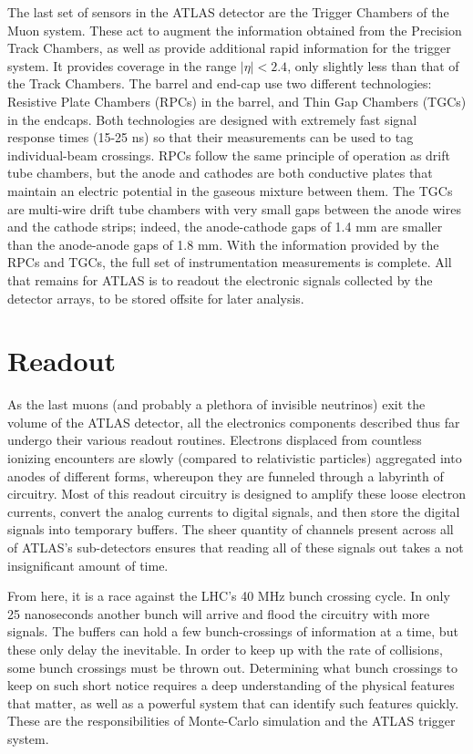         The last set of sensors in the ATLAS detector are the Trigger Chambers of the Muon system.
        These act to augment the information obtained from the Precision Track Chambers,
            as well as provide additional rapid information for the trigger system.
        It provides coverage in the range $|\eta| < 2.4$, only slightly less than that of the Track Chambers.
        The barrel and end-cap use two different technologies:
            Resistive Plate Chambers (RPCs) in the barrel, and Thin Gap Chambers (TGCs) in the endcaps.
        Both technologies are designed with extremely fast signal response times (15-25 ns) so that their measurements can be used to tag individual-beam crossings.
        RPCs follow the same principle of operation as drift tube chambers, but the anode and cathodes are both conductive plates that maintain an electric potential in the gaseous mixture between them.
        The TGCs are multi-wire drift tube chambers with very small gaps between the anode wires and the cathode strips;
            indeed, the anode-cathode gaps of 1.4 mm are smaller than the anode-anode gaps of 1.8 mm.
        With the information provided by the RPCs and TGCs, the full set of instrumentation measurements is complete.
        All that remains for ATLAS is to readout the electronic signals collected by the detector arrays, to be stored offsite for later analysis.

    

\section{Readout}

    As the last muons (and probably a plethora of invisible neutrinos) exit the volume of the ATLAS detector,
        all the electronics components described thus far undergo their various readout routines.
    Electrons displaced from countless ionizing encounters are slowly (compared to relativistic particles)
        aggregated into anodes of different forms,
        whereupon they are funneled through a labyrinth of circuitry.
    Most of this readout circuitry is designed to amplify these loose electron currents,
        convert the analog currents to digital signals,
        and then store the digital signals into temporary buffers.
    The sheer quantity of channels present across all of ATLAS's sub-detectors ensures that
        reading all of these signals out takes a not insignificant amount of time.

    From here, it is a race against the LHC's 40 MHz bunch crossing cycle.
    In only 25 nanoseconds another bunch will arrive and flood the circuitry with more signals.
    The buffers can hold a few bunch-crossings of information at a time, but these only delay the inevitable.
    In order to keep up with the rate of collisions, some bunch crossings must be thrown out.
    Determining what bunch crossings to keep on such short notice
        requires a deep understanding of the physical features that matter,
        as well as a powerful system that can identify such features quickly.
    These are the responsibilities of Monte-Carlo simulation and the ATLAS trigger system. 


